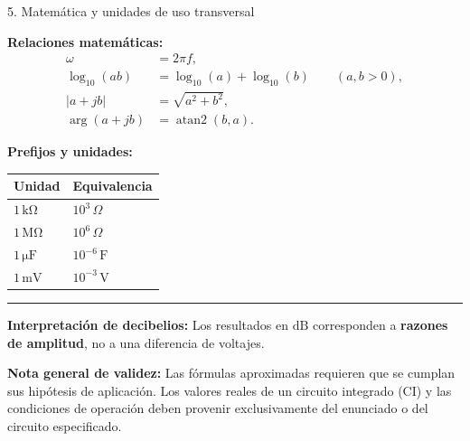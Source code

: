 \documentclass[10pt, a4paper]{article}
\begin{document}
\begin{formulabox}[accentteal]{5. Matemática y unidades de uso transversal}
    \begin{minipage}[t]{0.52\textwidth}
        \textbf{Relaciones matemáticas:}
        \begin{align}
            \omega &= 2\pi f, \\[2pt]
            \log_{10}(ab) &= \log_{10}(a) + \log_{10}(b) \qquad (a, b > 0), \\[2pt]
            |a + jb| &= \sqrt{a^2 + b^2}, \\[2pt]
            \arg(a + jb) &= \operatorname{atan2}(b, a).
        \end{align}
    \end{minipage}%
    \hfill
    \begin{minipage}[t]{0.44\textwidth}
        \textbf{Prefijos y unidades:}
        \vspace{0.15cm}
        \begin{center}
            \renewcommand{\arraystretch}{1.25}
            \begin{tabularx}{\textwidth}{@{}l X@{}}
                \toprule
                \textbf{Unidad} & \textbf{Equivalencia} \\
                \midrule
                $1\,\mathrm{k\Omega}$ & $10^{3}\,\Omega$ \\
                $1\,\mathrm{M\Omega}$ & $10^{6}\,\Omega$ \\
                $1\,\mathrm{\mu F}$ & $10^{-6}\,\mathrm{F}$ \\
                $1\,\mathrm{mV}$ & $10^{-3}\,\mathrm{V}$ \\
                \bottomrule
            \end{tabularx}
        \end{center}
    \end{minipage}

    \vspace{0.12cm}
    \hrule
    \vspace{0.12cm}
    \footnotesize
    \textbf{Interpretación de decibelios:} Los resultados en $\mathrm{dB}$ corresponden a \textbf{razones de amplitud}, no a una diferencia de voltajes.
\end{formulabox}

\begin{tcolorbox}[colback=warnbg, colframe=warnframe, boxrule=0.7pt, arc=1.2mm, left=7pt, right=7pt, top=5pt, bottom=5pt]
    \footnotesize
    \textbf{Nota general de validez:} Las fórmulas aproximadas requieren que se cumplan sus hipótesis de aplicación. Los valores reales de un circuito integrado (CI) y las condiciones de operación deben provenir exclusivamente del enunciado o del circuito especificado.
\end{tcolorbox}
\end{document}
